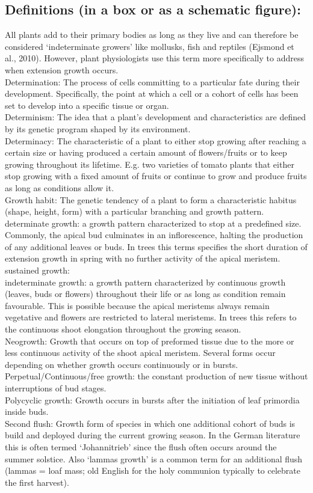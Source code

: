\documentclass{article}
\begin{document}
\subsection*{Definitions (in a box or as a schematic figure):}
All plants add to their primary bodies as long as they live and can therefore be considered ‘indeterminate growers’ like mollusks, fish and reptiles (Ejsmond et al., 2010). However, plant physiologists use this term more specifically to address when extension growth occurs.\\
Determination: The process of cells committing to a particular fate during their development. Specifically, the point at which a cell or a cohort of cells has been set to develop into a specific tissue or organ.\\
Determinism: The idea that a plant’s development and characteristics are defined by its genetic program shaped by its environment. \\
Determinacy: The characteristic of a plant to either stop growing after reaching a certain size or having produced a certain amount of flowers/fruits or to keep growing throughout its lifetime. E.g. two varieties of tomato plants that either stop growing with a fixed amount of fruits or continue to grow and produce fruits as long as conditions allow it. \\
Growth habit: The genetic tendency of a plant to form a characteristic habitus (shape, height, form) with a particular branching and growth pattern. 
determinate growth: a growth pattern characterized to stop at a predefined size. Commonly, the apical bud culminates in an inflorescence, halting the production of any additional leaves or buds. In trees this terms specifies the short duration of extension growth in spring with no further activity of the apical meristem.\\
sustained growth:\\
indeterminate growth: a growth pattern characterized by continuous growth (leaves, buds or flowers) throughout their life or as long as condition remain favourable. This is possible because the apical meristems always remain vegetative and flowers are restricted to lateral meristems. In trees this refers to the continuous shoot elongation throughout the growing season.\\
Neogrowth: Growth that occurs on top of preformed tissue due to the more or less continuous activity of the shoot apical meristem. Several forms occur depending on whether growth occurs continuously or in bursts.\\
Perpetual/Continuous/free growth: the constant production of new tissue without interruptions of bud stages.\\
Polycyclic growth: Growth occurs in bursts after the initiation of leaf primordia inside buds.  \\
Second flush: Growth form of species in which one additional cohort of buds is build and deployed during the current growing season. In the German literature this is often termed ‘Johannitrieb’ since the flush often occurs around the summer solstice. Also ‘lammas growth’ is a common term for an additional flush (lammas = loaf mass; old English for the holy communion typically to celebrate the first harvest).\\
\end{document}
